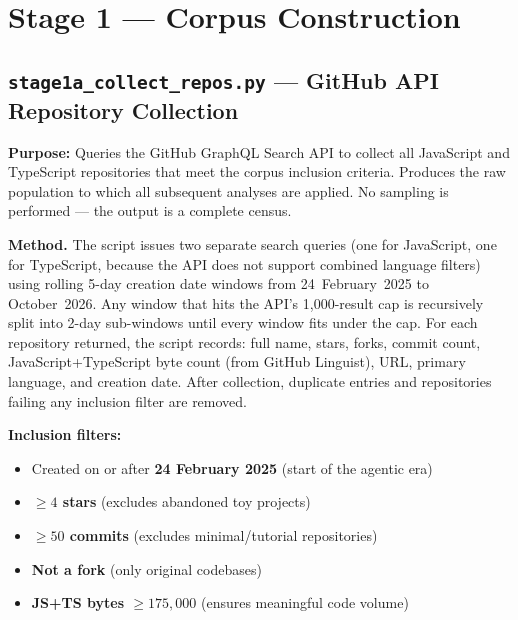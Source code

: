\documentclass[11pt,a4paper]{article}
\begin{document}
\newpage

\section{Stage 1 --- Corpus Construction}

\subsection*{\texttt{stage1a\_collect\_repos.py} --- GitHub API Repository Collection}

\begin{infobox}
\textbf{Purpose:} Queries the GitHub GraphQL Search API to collect all JavaScript
and TypeScript repositories that meet the corpus inclusion criteria.
Produces the raw population to which all subsequent analyses are applied.
No sampling is performed --- the output is a complete census.
\end{infobox}

\textbf{Method.}
The script issues two separate search queries (one for JavaScript, one for
TypeScript, because the API does not support combined language filters) using
rolling 5-day creation date windows from 24~February~2025 to October~2026.
Any window that hits the API's 1,000-result cap is recursively split into
2-day sub-windows until every window fits under the cap. For each repository
returned, the script records: full name, stars, forks, commit count,
JavaScript+TypeScript byte count (from GitHub Linguist), URL, primary
language, and creation date. After collection, duplicate entries and
repositories failing any inclusion filter are removed.

\textbf{Inclusion filters:}
\begin{itemize}
  \item Created on or after \textbf{24 February 2025} (start of the agentic era)
  \item \textbf{$\geq 4$ stars} (excludes abandoned toy projects)
  \item \textbf{$\geq 50$ commits} (excludes minimal/tutorial repositories)
  \item \textbf{Not a fork} (only original codebases)
  \item \textbf{JS+TS bytes $\geq 175{,}000$} (ensures meaningful code volume)
\end{itemize}
\end{document}
